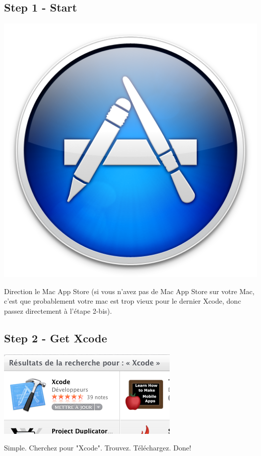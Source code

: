 \documentclass[11pt,a4paper]{article}
\begin{document}
\subsection{Step 1 - Start}
\begin{minipage}[c]{.20\linewidth}
\includegraphics[width=\linewidth]{macapp.png}
\end{minipage} \hfill
\begin{minipage}[c]{.74\linewidth}
Direction le Mac App Store (si vous n'avez pas de Mac App Store sur votre Mac, c'est que probablement votre mac est trop vieux pour le dernier Xcode, donc passez directement à l'étape 2-bis).
\end{minipage}

\subsection{Step 2 - Get Xcode}
\begin{minipage}[c]{.40\linewidth}
\includegraphics[width=\linewidth]{getxcode.png}
\end{minipage} \hfill
\begin{minipage}[c]{.50\linewidth}
Simple. Cherchez pour "Xcode". Trouvez. Téléchargez. Done!
\end{minipage}
\end{document}
